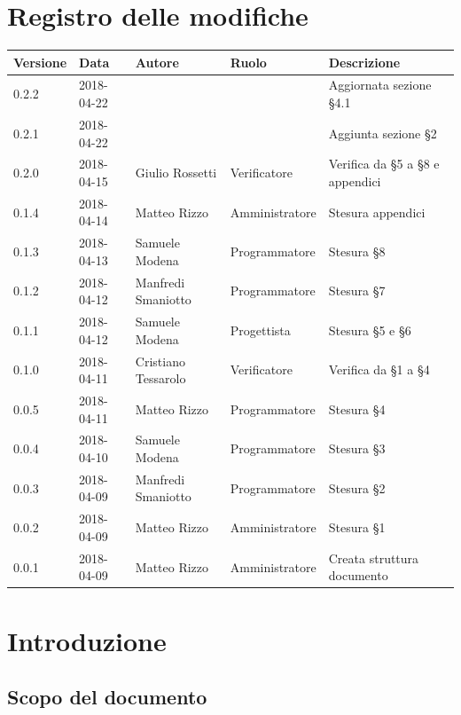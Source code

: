 \documentclass[openany,12pt,a4paper]{report}
\begin{document}
	\chapter*{Registro delle modifiche}
	\setlength\LTleft{-22mm}
	\begin{longtable}{|p{20mm}|p{20mm}|p{40mm}|p{30mm}|p{50mm}|}
		\hline
		\textbf{Versione} & \textbf{Data} & \textbf{Autore} & \textbf{Ruolo} & \textbf{Descrizione} \\
		
		\hline 0.2.2 & 2018-04-22 &  &  & Aggiornata sezione §4.1 \\
		\hline 0.2.1 & 2018-04-22 &  &  & Aggiunta sezione §2 \\
		\hline 0.2.0 & 2018-04-15 & Giulio Rossetti & Verificatore & Verifica da §5 a §8 e appendici \\
		\hline 0.1.4 & 2018-04-14 & Matteo Rizzo & Amministratore & Stesura appendici \\
		\hline 0.1.3 & 2018-04-13 & Samuele Modena & Programmatore & Stesura §8 \\
		\hline 0.1.2 & 2018-04-12 & Manfredi Smaniotto & Programmatore & Stesura §7 \\		
		\hline 0.1.1 & 2018-04-12 & Samuele Modena & Progettista & Stesura §5 e §6 \\
		\hline 0.1.0 & 2018-04-11 & Cristiano Tessarolo & Verificatore & Verifica da §1 a §4 \\
		\hline 0.0.5 & 2018-04-11 & Matteo Rizzo & Programmatore & Stesura §4 \\	
		\hline 0.0.4 & 2018-04-10 & Samuele Modena & Programmatore & Stesura §3 \\
		\hline 0.0.3 & 2018-04-09 & Manfredi Smaniotto & Programmatore & Stesura §2 \\
		\hline 0.0.2 & 2018-04-09 & Matteo Rizzo & Amministratore & Stesura §1 \\
		\hline 0.0.1 & 2018-04-09 & Matteo Rizzo & Amministratore & Creata struttura documento \\
		\hline
		
	\end{longtable}
	
	
	\tableofcontents
	
	
	\chapter{Introduzione}
	
	\section{Scopo del documento}
	
\end{document}
